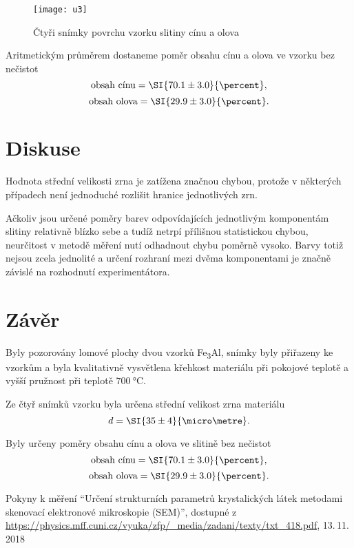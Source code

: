\documentclass{protokol}
\begin{document}
      \vspace{-8pt}
      
      \begin{figure}[H]
        \centering
        \texttt{[image: u3]}
        \vspace{5pt}
        \caption{Čtyři snímky povrchu vzorku slitiny cínu a olova}
        \label{fig:u3}
      \end{figure}
      \vspace{-10pt}
      
      Aritmetickým průměrem dostaneme poměr obsahu cínu a olova ve vzorku bez nečistot 
      $$ \text{obsah cínu} = \SI{70.1 \pm 3.0}{\percent}, $$ 
      $$ \text{obsah olova} = \SI{29.9 \pm 3.0}{\percent}. $$

  \section*{Diskuse}

    Hodnota střední velikosti zrna je zatížena značnou chybou, protože v některých případech není jednoduché rozlišit hranice jednotlivých zrn. 

    Ačkoliv jsou určené poměry barev odpovídajících jednotlivým komponentám slitiny relativně blízko sebe a tudíž netrpí přílišnou statistickou chybou, neurčitost v metodě měření nutí odhadnout chybu poměrně vysoko. Barvy totiž nejsou zcela jednolité a určení rozhraní mezi dvěma komponentami je značně závislé na rozhodnutí experimentátora.


  \section*{Závěr}

    Byly pozorovány lomové plochy dvou vzorků Fe\textsubscript{3}Al, snímky byly přiřazeny ke vzorkům a byla kvalitativně vysvětlena křehkost materiálu při pokojové teplotě a vyšší pružnost při teplotě $\SI{700}{\celsius}$. 

    Ze čtyř snímků vzorku byla určena střední velikost zrna materiálu 
    $$ d = \SI{35 \pm 4}{\micro\metre}. $$

    Byly určeny poměry obsahu cínu a olova ve slitině bez nečistot
    $$ \text{obsah cínu} = \SI{70.1 \pm 3.0}{\percent}, $$ 
    $$ \text{obsah olova} = \SI{29.9 \pm 3.0}{\percent}. $$


  \begin{thebibliography}{}
 
    Pokyny k měření ``Určení strukturních parametrů krystalických látek metodami skenovací elektronové mikroskopie (SEM)'', dostupné z\\ \url{https://physics.mff.cuni.cz/vyuka/zfp/_media/zadani/texty/txt_418.pdf}, 13.\,11.\,2018
   
  \end{thebibliography}
\end{document}
